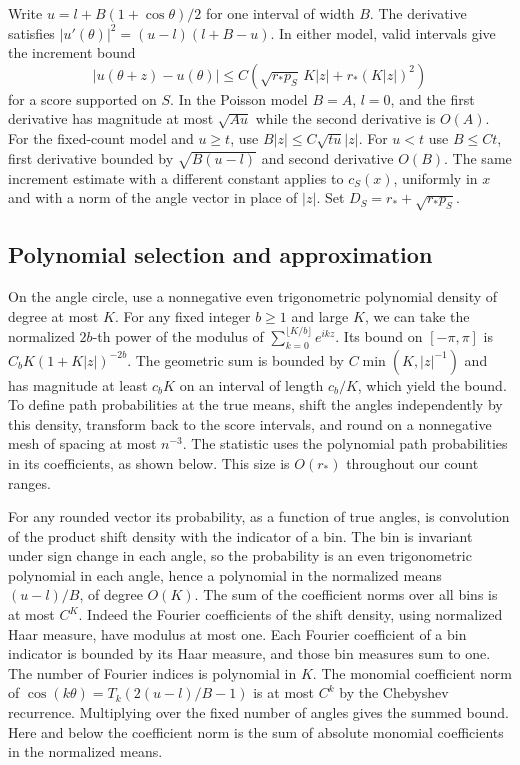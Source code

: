 Write \(u=l+B(1+\cos\theta)/2\) for one interval of width \(B\).
The derivative satisfies \(|u'(\theta)|^2=(u-l)(l+B-u)\).
In either model, valid intervals give the increment bound
\begin{equation}\label{eq:increment}
 |u(\theta+z)-u(\theta)|
 \le C\left(\sqrt{r_*p_S}\,K|z|+r_*(K|z|)^2\right)
\end{equation}
for a score supported on \(S\). In the Poisson model
\(B=A\), \(l=0\), and the first derivative has magnitude at most
\(\sqrt{Au}\) while the second derivative is \(O(A)\).
For the fixed-count model and \(u\ge t\), use
\(B|z|\le C\sqrt{tu}|z|\).
For \(u<t\) use \(B\le Ct\), first derivative bounded by
\(\sqrt{B(u-l)}\) and second derivative \(O(B)\).
The same increment estimate with a different constant applies
to \(c_S(x)\), uniformly in \(x\) and with a norm of the angle
vector in place of \(|z|\). Set \(D_S=r_*+\sqrt{r_*p_S}\).

\subsection{Polynomial selection and approximation}

On the angle circle, use a nonnegative even trigonometric
polynomial density of degree at most \(K\). For any fixed
integer \(b\ge1\) and large \(K\), we can take the normalized
\(2b\)-th power of the modulus of
\(\sum_{k=0}^{\lfloor K/b\rfloor}e^{ikz}\).
Its bound on \([-\pi,\pi]\) is
\(C_b K(1+K|z|)^{-2b}\). The geometric sum is bounded by
\(C\min(K,|z|^{-1})\) and has magnitude at least \(c_b K\)
on an interval of length \(c_b/K\), which yield the bound.
To define path probabilities at the true means, shift the
angles independently by this density, transform back to the
score intervals, and round on a nonnegative mesh of spacing at
most \(n^{-3}\). The statistic uses the polynomial path
probabilities in its coefficients, as shown below.
This size is \(O(r_*)\) throughout our count ranges.

For any rounded vector its probability, as a function of true
angles, is convolution of the product shift density with the
indicator of a bin. The bin is invariant under sign change in
each angle, so the probability is an even trigonometric
polynomial in each angle, hence a polynomial in the normalized
means \((u-l)/B\), of degree \(O(K)\). The sum of the
coefficient norms over all bins is at most \(C^K\).
Indeed the Fourier coefficients of the shift density, using
normalized Haar measure, have modulus at most one.
Each Fourier coefficient of a bin indicator is bounded by
its Haar measure, and those bin measures sum to one.
The number of Fourier indices is polynomial in \(K\).
The monomial coefficient norm of
\(\cos(k\theta)=T_k(2(u-l)/B-1)\) is at most \(C^k\)
by the Chebyshev recurrence. Multiplying over the fixed
number of angles gives the summed bound. Here and below the
coefficient norm is the sum of absolute monomial coefficients
in the normalized means.

